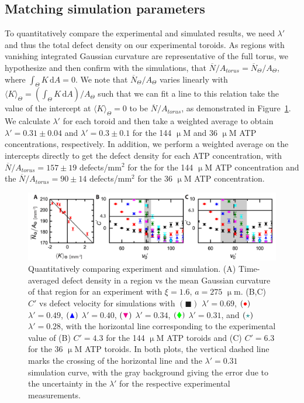 \subsection{Matching simulation parameters}
To quantitatively compare the experimental and simulated results, we need $\lambda'$ and thus the total defect density on our experimental toroids.
As regions with vanishing integrated Gaussian curvature are representative of the full torus, we hypothesize and then confirm with the simulations, that $\overbar{N}/A_{torus} = \overbar{N}_{\Theta}/A_{\Theta}$, where  $\int_{\Theta} K\, \textrm{d}A = 0$.
We note that $\overbar{N}_{\Theta}/A_{\Theta}$ varies linearly with $\langle K \rangle_{\Theta} = (\int_{\Theta}K\,\textrm{d}A)/A_{\Theta}$ such that we can fit a line to this relation take the value of the intercept at $\langle K \rangle_{\Theta} = 0$ to be $\overbar{N}/A_{torus}$, as demonstrated in Figure~\ref{f:3-MatchParam}.
We calculate $\lambda'$ for each toroid and then take a weighted average to obtain $\lambda' = 0.31 \pm 0.04$ and $\lambda' = 0.3 \pm 0.1$ for the 144 $\upmu$M and 36 $\upmu$M ATP concentrations, respectively.
In addition, we perform a weighted average on the intercepts directly to get the defect density for each ATP concentration, with $\overbar{N}/A_{torus} = 157 \pm 19$ defects/mm$^{2}$ for the for the 144 $\upmu$M ATP concentration and the $\overbar{N}/A_{torus} = 90 \pm 14$ defects/mm$^{2}$ for the 36 $\upmu$M ATP concentration.
\begin{figure}
  \centering
  \includegraphics{figures/C3/Ch3-Figs_MatchParam.png}
  \caption{Quantitatively comparing experiment and simulation.
  (A) Time-averaged defect density in a region vs the mean Gaussian curvature of that region for an experiment with $\xi = 1.6$, $a = 275$ $\upmu$m.
  (B,C) $C'$ vs defect velocity for simulations with
  $({\blacksquare})$ $\lambda' = 0.69$,
  $({\color{red} \bullet})$ $\lambda' = 0.49$,
  $({\color{blue} \blacktriangle})$ $\lambda' = 0.40$,
  $({\color{magenta} \blacktriangledown})$ $\lambda' = 0.34$,
  $({\color{green} \blacklozenge})$ $\lambda' = 0.31$, and
  $({\color{teal} \star})$ $\lambda' = 0.28$,
  with the horizontal line corresponding to the experimental value of (B) $C' = 4.3$ for the 144 $\upmu$M ATP toroids and (C) $C' = 6.3$ for the 36 $\upmu$M ATP toroids.
  In both plots, the vertical dashed line marks the crossing of the horizontal line and the $\lambda' = 0.31$ simulation curve, with the gray background giving the error due to the uncertainty in the $\lambda'$ for the respective experimental measurements.}\label{f:3-MatchParam}
\end{figure}

